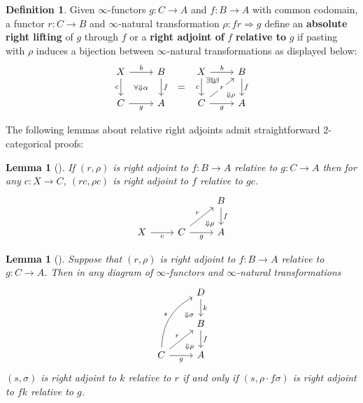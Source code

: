 \documentclass[11pt]{ctexart}
\newtheorem{lem}[thm]{Lemma}
\theoremstyle{definition}
\newtheorem{defn}[thm]{Definition}
\theoremstyle{remark}
\numberwithin{equation}{section}
\newcommand{\To}{\Rightarrow}
\newcommand{\1}{\mathbbe{1}}
\newcommand{\2}{\mathbbe{2}}
\newcommand{\3}{\mathbbe{3}}
\begin{document}
\begin{defn} Given $\infty$-functors $g \colon C \to A$ and $f \colon B \to A$ with common co\-do\-main, a functor $r \colon C \to B$ and $\infty$-natural transformation $\rho \colon fr \To g$ define an \textbf{absolute right lifting} of $g$ through $f$ or a \textbf{right adjoint of} $f$ \textbf{relative to} $g$ if pasting with $\rho$ induces a bijection between $\infty$-natural transformations as displayed below:
\[
    \begin{tikzcd} X \arrow[r, "b"] \arrow[d, "c"'] \arrow[dr, phantom, "\scriptstyle\forall\Downarrow\alpha"] & B \arrow[d, "f"] & X \arrow[r, "b"] \arrow[d, "c"'] \arrow[dr, phantom, "\scriptstyle\exists!\!\Downarrow\!\beta" very near start, "\scriptstyle\Downarrow\rho" very near end] & B \arrow[d, "f"]\\ C \arrow[r, "g"'] & A \arrow[ur, phantom, "="] & C \arrow[r, "g"'] \arrow[ur, "r" description] & A
    \end{tikzcd}
\]
\end{defn}

The following lemmas about relative right adjoints admit straightforward 2-categorical proofs:

\begin{lem}[{\cite[2.3.6]{RV}}]\label{lem:absolute-restriction} If $(r,\rho)$ is right adjoint to $f \colon B \to A$ relative to $g \colon C \to A$ then for any $c \colon X \to C$, $(rc,\rho c)$ is right adjoint to $f$ relative to $gc$.
    \[
        \begin{tikzcd}&  \arrow[dr, phantom, "\scriptstyle\Downarrow\rho" very near end] & B\arrow[d, "f"] \\ X \arrow[r, "c"'] & C \arrow[r, "g"'] \arrow[ur, "r"] & A
        \end{tikzcd}
    \]
\end{lem}

\begin{lem}[{\cite[2.4.1]{RV}}]\label{lem:absolute-pasting}
Suppose that $(r,\rho)$ is right adjoint to $f \colon B \to A$ relative to $g \colon C \to A$. Then in any diagram of $\infty$-functors and $\infty$-natural transformations
\[
    \begin{tikzcd} \arrow[dr, phantom, "\scriptstyle\Downarrow\sigma" very near end] & D \arrow[d, "k"] \\ \arrow[dr, phantom, "\scriptstyle\Downarrow\rho" very near end] & B \arrow[d, "f"] \\ C \arrow[r, "g"'] \arrow[ur, "r"] \arrow[uur, "s", bend left] & A
    \end{tikzcd}
\]
$(s,\sigma)$ is right adjoint to $k$ relative to $r$ if and only if $(s, \rho \cdot f\sigma)$ is right adjoint to $fk$ relative to $g$.
\end{lem}
\end{document}
